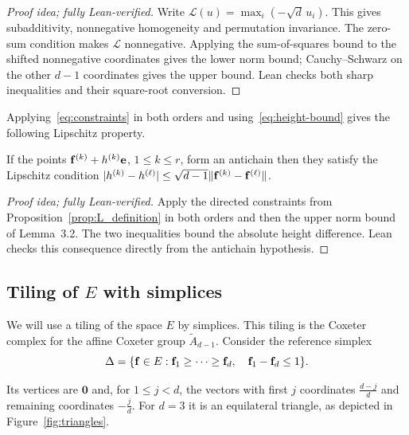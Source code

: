 \documentclass[11pt,letterpaper]{article}
\begin{document}
\begin{proof}[Proof idea; fully Lean-verified]
Write $\mathcal L(u)=\max_i(-\sqrt d\,u_i)$. This gives subadditivity, nonnegative homogeneity and permutation invariance. The zero-sum condition makes $\mathcal L$ nonnegative. Applying the sum-of-squares bound to the shifted nonnegative coordinates gives the lower norm bound; Cauchy--Schwarz on the other $d-1$ coordinates gives the upper bound. Lean checks both sharp inequalities and their square-root conversion.
\end{proof}

Applying~\eqref{eq:constraints} in both orders and using~\eqref{eq:height-bound} gives the following Lipschitz property.


\begin{lemma}\label{lem:height}\label{cor:height}
      If the points $\mathbf f^{(k)}+h^{(k)}\mathbf e$, $1\le k\le r$, form an antichain then they satisfy the Lipschitz condition $|h^{(k)}-h^{(\ell)}|\le\sqrt{d-1}\|\mathbf f^{(k)}-\mathbf f^{(\ell)}\|$.
\end{lemma}

\begin{proof}[Proof idea; fully Lean-verified]
Apply the directed constraints from Proposition~\ref{prop:L_definition} in both orders and then the upper norm bound of Lemma~3.2. The two inequalities bound the absolute height difference. Lean checks this consequence directly from the antichain hypothesis.
\end{proof}

\subsection{Tiling of \texorpdfstring{$E$}{E} with simplices}\label{sec:tiling}
We will use a tiling of the space $E$ by simplices. This tiling is the Coxeter complex for the affine Coxeter group $\widetilde{A}_{d-1}$. Consider the reference simplex
\[
      \Delta=\{\mathbf f\in E:\mathbf f_1\ge\cdots\ge\mathbf f_d,\quad \mathbf f_1-\mathbf f_d\le1\}.
\]

Its vertices are $\mathbf0$ and, for $1\le j<d$, the vectors with first $j$ coordinates $\frac{d-j}{d}$ and remaining coordinates $-\frac jd$. For $d=3$ it is an equilateral triangle, as depicted in Figure~\ref{fig:triangles}.
\end{document}
